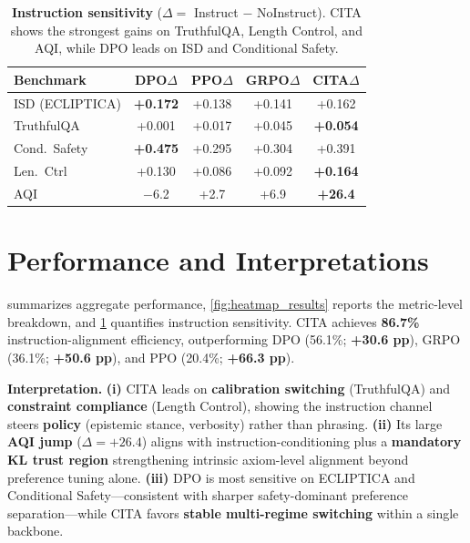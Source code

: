 \vspace{-1.5em}
\begin{table}[H]
\centering
\footnotesize
\setlength{\tabcolsep}{4pt}
\renewcommand{\arraystretch}{1.2}
\begin{tabular}{@{}lcccc@{}}
\toprule
\textbf{Benchmark} & \textbf{DPO$\Delta$} & \textbf{PPO$\Delta$} & \textbf{GRPO$\Delta$} & \textbf{CITA$\Delta$} \\
\midrule
ISD (ECLIPTICA) & \textbf{+0.172} & +0.138 & +0.141 & +0.162 \\ \hline
TruthfulQA & +0.001 & +0.017 & +0.045 & \textbf{+0.054} \\ \hline
Cond.\ Safety & \textbf{+0.475} & +0.295 & +0.304 & +0.391 \\ \hline
Len.\ Ctrl & +0.130 & +0.086 & +0.092 & \textbf{+0.164} \\ \hline
AQI & $-$6.2 & +2.7 & +6.9 & \textbf{+26.4} \\
\bottomrule
\end{tabular}
\vspace{-0.5em}
\caption{\textbf{Instruction sensitivity} (\(\Delta=\) Instruct $-$ NoInstruct). \textsc{CITA} shows the strongest gains on TruthfulQA, Length Control, and AQI, while \textsc{DPO} leads on ISD and Conditional Safety.}
\label{tab:improvement_comparison}
\vspace{-3mm}
\end{table}

\vspace{-2mm}
\section*{Performance and Interpretations}
\label{sec:overall_results}
 summarizes aggregate performance, \cref{fig:heatmap_results} reports the metric-level breakdown, and \cref{tab:improvement_comparison} quantifies instruction sensitivity. \textsc{CITA} achieves \textbf{86.7\%} instruction-alignment efficiency, outperforming \textsc{DPO} (56.1\%; \textbf{+30.6 pp}), \textsc{GRPO} (36.1\%; \textbf{+50.6 pp}), and \textsc{PPO} (20.4\%; \textbf{+66.3 pp}). 

\noindent\textbf{Interpretation.}
\textbf{(i)} \textsc{CITA} leads on \textbf{calibration switching} (TruthfulQA) and \textbf{constraint compliance} (Length Control), showing the instruction channel steers \textbf{policy} (epistemic stance, verbosity) rather than phrasing. 
\textbf{(ii)} Its large \textbf{AQI jump} (\(\Delta=+26.4\)) aligns with instruction-conditioning plus a \textbf{mandatory KL trust region} strengthening intrinsic axiom-level alignment beyond preference tuning alone. 
\textbf{(iii)} \textsc{DPO} is most sensitive on ECLIPTICA and Conditional Safety—consistent with sharper safety-dominant preference separation—while \textsc{CITA} favors \textbf{stable multi-regime switching} within a single backbone.




